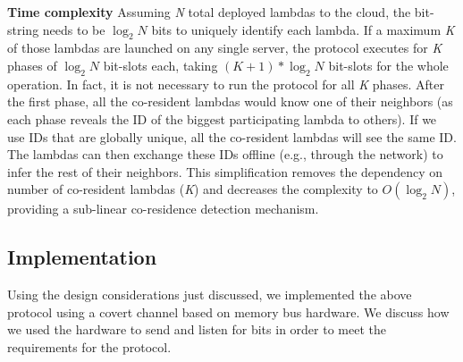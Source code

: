 \textbf{Time complexity}
\label{sec:protocol:complexity}
Assuming \textit{N} total deployed lambdas to the cloud, the bit-string needs
to be $\log_2N$ bits to uniquely identify each lambda. If a maximum \textit{K}
of those lambdas are launched on any single server, the protocol executes for
\textit{K} phases of $\log_2N$ bit-slots each, taking $(K+1)*\log_2N$ bit-slots
for the whole operation.  In fact, it is not necessary to run the protocol for all \textit{K}
phases. After the first phase, all the co-resident lambdas would know one of
their neighbors (as each phase reveals the ID of the biggest participating
lambda to others).  If we use IDs that are globally unique, all the
co-resident lambdas will see the same ID. The lambdas can then exchange these IDs
offline (e.g., through the network) to infer the rest of their neighbors. This
simplification removes the dependency on number of co-resident lambdas
(\textit{K}) and decreases the complexity to $O(\log_2N)$, providing a
sub-linear co-residence detection mechanism.


\subsection{Implementation}
\label{sec:method:impl}
Using the design considerations just discussed, we implemented the above
protocol using a covert channel based on memory bus hardware.  We discuss how we
used the hardware to send and listen for bits in order to meet the requirements
for the protocol. 


